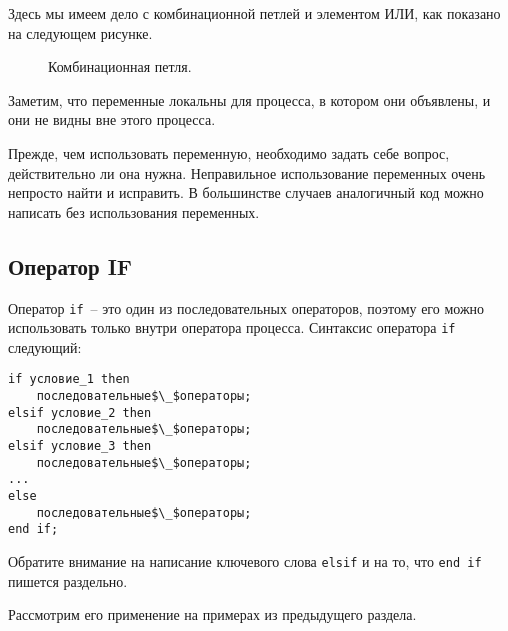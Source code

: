 Здесь мы имеем дело с комбинационной петлей и элементом ИЛИ, как показано на следующем рисунке.

\begin{figure}[ht]
\centering
{}
\caption{Комбинационная петля.}
\label{comb_loop}
\end{figure}

Заметим, что переменные локальны для процесса, в котором они объявлены, и они не видны вне этого процесса.

Прежде, чем использовать переменную, необходимо задать себе вопрос, действительно ли она нужна. Неправильное использование переменных очень непросто найти и исправить. В большинстве случаев аналогичный код можно написать без использования переменных.

\subsection{Оператор IF}
Оператор \lstinline?if?~-- это один из последовательных операторов, поэтому его можно использовать только внутри оператора процесса. Синтаксис оператора \lstinline?if? следующий:

\begin{Code}
\begin{lstlisting}[mathescape]
if условие_1 then
    последовательные$\_$операторы;
elsif условие_2 then
    последовательные$\_$операторы;
elsif условие_3 then
    последовательные$\_$операторы;
...
else
    последовательные$\_$операторы;
end if;
\end{lstlisting}
\end{Code}

Обратите внимание на написание ключевого слова \lstinline?elsif? и на то, что \lstinline?end if? пишется раздельно.

Рассмотрим его применение на примерах из предыдущего раздела.

